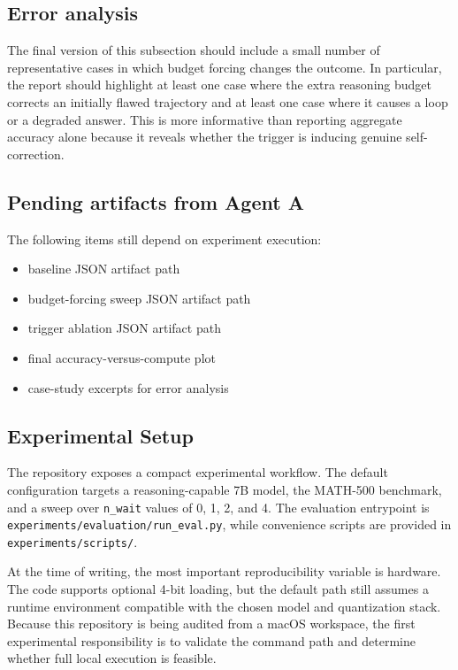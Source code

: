 \subsection{Error analysis}

The final version of this subsection should include a small number of representative cases in which budget forcing changes the outcome. In particular, the report should highlight at least one case where the extra reasoning budget corrects an initially flawed trajectory and at least one case where it causes a loop or a degraded answer. This is more informative than reporting aggregate accuracy alone because it reveals whether the trigger is inducing genuine self-correction.

\subsection{Pending artifacts from Agent A}

The following items still depend on experiment execution:

\begin{itemize}
  \item baseline JSON artifact path
  \item budget-forcing sweep JSON artifact path
  \item trigger ablation JSON artifact path
  \item final accuracy-versus-compute plot
  \item case-study excerpts for error analysis
\end{itemize}
\label{sec:experiments}

\subsection{Experimental Setup}

The repository exposes a compact experimental workflow. The default configuration targets a reasoning-capable 7B model, the MATH-500 benchmark, and a sweep over \texttt{n\_wait} values of 0, 1, 2, and 4. The evaluation entrypoint is \texttt{experiments/evaluation/run\_eval.py}, while convenience scripts are provided in \texttt{experiments/scripts/}.

At the time of writing, the most important reproducibility variable is hardware. The code supports optional 4-bit loading, but the default path still assumes a runtime environment compatible with the chosen model and quantization stack. Because this repository is being audited from a macOS workspace, the first experimental responsibility is to validate the command path and determine whether full local execution is feasible.

